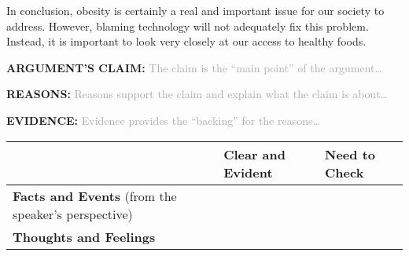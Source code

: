 \documentclass[12pt]{article}
\begin{document}
In conclusion, obesity is certainly a real and important issue for our society to address. However, blaming technology will not adequately fix this problem. Instead, it is important to look very closely at our access to healthy foods.

\newpage

\noindent\large\textbf{ARGUMENT’S CLAIM:} \small\textsf{\textcolor{darkgray}{The claim is the “main point” of the argument\ldots}}\normalsize\\
\bigskip
\bigskip

\noindent\large\textbf{REASONS:} \small\textsf{\textcolor{darkgray}{Reasons support the claim and explain what the claim is about\ldots}}\normalsize\\
\bigskip
\bigskip

\noindent\large\textbf{EVIDENCE:} \small\textsf{\textcolor{darkgray}{Evidence provides the “backing” for the reasons\ldots}}\large\\

\begin{tabular}{|p{1in}|p{2.5in}|p{2.5in}|}
 & Clear and Evident & Need to Check\\
 \toprule
 \small\raggedright\textbf{Facts and Events} (from the speaker's perspective) & & \\[30ex]
 \midrule
 \small\raggedright\textbf{Thoughts and Feelings} & & \\[30ex]
 \bottomrule
\end{tabular}
\normalsize
\end{document}
